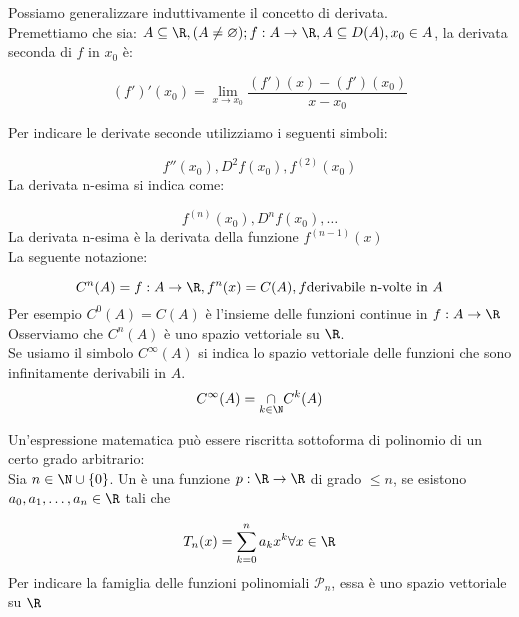 \documentclass[../analisi.tex]{subfiles}
\begin{document}
\begin{defn}
Possiamo generalizzare induttivamente il concetto di derivata.\\
Premettiamo che sia: $ A \subseteq \R, ( A \neq \varnothing ); f: A \to \R,
A \subseteq D ( A ), x_0 \in A$, la derivata seconda di 
$ f $ in $ x_0 $ è:

\begin{equation}
	( f' )' ( x_0 ) = \lim_{x \to x_0 } \frac{( f' )( x ) - ( f' )( x_0 )  }
	{x-x_0} 
\end{equation}
\end{defn}
Per indicare le derivate seconde utilizziamo i seguenti simboli:

\begin{equation}
	f''( x_0 ), D^2 f(x_0), f^{( 2 ) }( x_0 ) 
\end{equation}
La derivata n-esima si indica come:

\begin{equation}
	f^{( n ) } ( x_0 ), D^n f(x_0), \dots
\end{equation}
La derivata n-esima è la derivata della funzione $ f^{( n-1 ) }( x )  $\\
La seguente notazione:

\begin{equation}
	C^n ( A ) = f: A \to \R, f^n ( x ) = C(A), f \text{derivabile n-volte in }A
\end{equation}
Per esempio $ C^0 ( A ) = C ( A )  $ è l'insieme delle funzioni continue in
$ f: A \to \R $\\
Osserviamo che $ C^n ( A )  $ è uno spazio vettoriale su $ \R $.\\
Se usiamo il simbolo $ C^{\infty} ( A )  $ si indica lo spazio vettoriale delle
funzioni che sono infinitamente derivabili in $ A $.\\

\begin{equation}
	C^\infty ( A ) = \underset{k \in \N}{\cap} C^k ( A ) 
\end{equation}


\begin{defn}
	Un'espressione matematica può essere riscritta sottoforma di 
	polinomio di un certo grado arbitrario:\\
	Sia $ n \in \N \cup \{ 0 \} $.
	Un  è una funzione $ p: \R \to \R $ di grado
	$ \leq n $, se esistono $ a_0, a_1,\dots, a_n \in \R $ tali che

	\begin{equation}
		T_n ( x ) = \sum^{n}_{k=0} a_k x^k \forall x \in \R
	\end{equation}
	Per indicare la famiglia delle funzioni polinomiali
	$\mathcal{P}_n$, essa è uno spazio vettoriale su $\R$
\end{defn}
\end{document}

